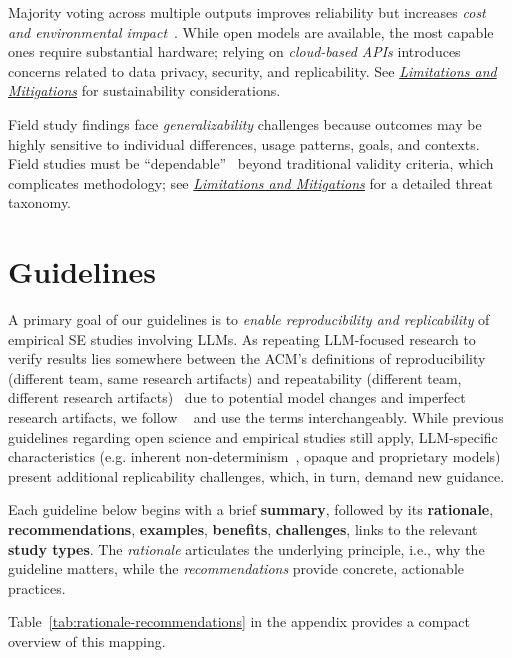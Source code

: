 \documentclass[smallextended]{svjour3}
\newif\ifpaper\papertrue
\newcommand{\limitationsmitigations}{\hyperref[sec:report-limitations-and-mitigations]{\emph{Limitations and Mitigations}}\xspace}
\newcommand{\limitationsmitigations}{\href{/guidelines\#report-limitations-and-mitigations}{\emph{Limitations and Mitigations}}\xspace}
\begin{document}
Majority voting across multiple outputs improves reliability but increases \emph{cost and environmental impact}~\cite{DBLP:journals/corr/abs-2304-11085, DBLP:conf/emnlp/WangLXZZ21}. While open models are available, the most capable ones require substantial hardware; relying on \emph{cloud-based APIs} introduces concerns related to data privacy, security, and replicability. See \limitationsmitigations for sustainability considerations.

Field study findings face \emph{generalizability} challenges because outcomes may be highly sensitive to individual differences, usage patterns, goals, and contexts. Field studies must be ``dependable''~\cite{Sullivan2011-ub} beyond traditional validity criteria, which complicates methodology; see \limitationsmitigations for a detailed threat taxonomy.
 
\section{Guidelines}
\label{sec:guidelines}

A primary goal of our guidelines is to \emph{enable reproducibility and replicability} of empirical SE studies involving LLMs. As repeating LLM-focused research to verify results lies somewhere between the ACM's definitions of reproducibility (different team, same research artifacts) and repeatability (different team, different research artifacts)~\cite{acm2020artifactreview} due to potential model changes and imperfect research artifacts, we follow \citeauthor{DBLP:journals/corr/abs-2510-25506}~\cite{DBLP:journals/corr/abs-2510-25506} and use the terms interchangeably. While previous guidelines regarding open science and empirical studies still apply, LLM-specific characteristics (e.g. inherent non-determinism~\cite{DBLP:conf/naacl/SongWLL25, YuanNondeterminismLLMInference}, opaque and proprietary models) present additional replicability challenges, which, in turn, demand new guidance.

Each guideline below begins with a brief \textbf{summary}, followed by its \textbf{rationale}, \textbf{recommendations}, \textbf{examples}, \textbf{benefits}, \textbf{challenges}, links to the relevant \textbf{study types}.
The \emph{rationale} articulates the underlying principle, i.e., why the guideline matters, while the \emph{recommendations} provide concrete, actionable practices.
\ifpaper
Table~\ref{tab:rationale-recommendations} in the appendix provides a compact overview of this mapping.
\fi
\end{document}
